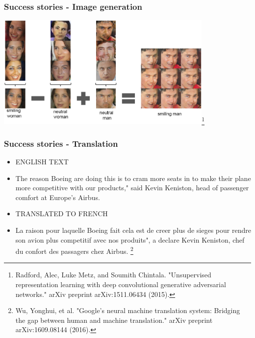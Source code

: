 \documentclass[\beamerclass]{beamer}
\begin{document}
\begin{frame}
	\frametitle{Success stories - Image generation}
	\centering \includegraphics[width=0.8\textwidth]{imggen.pdf}\footnote{Radford, Alec, Luke Metz, and Soumith Chintala. "Unsupervised representation learning with deep convolutional generative adversarial networks." arXiv preprint arXiv:1511.06434 (2015).}
\end{frame}

\begin{frame}
	\frametitle{Success stories - Translation}

\begin{itemize}
\item ENGLISH TEXT
\item The reason Boeing are doing this is to cram more seats in to make their plane
more competitive with our products," said Kevin Keniston, head of passenger
comfort at Europe's Airbus.
\item TRANSLATED TO FRENCH
\item La raison pour laquelle Boeing fait cela est de creer plus de sieges pour rendre
son avion plus competitif avec nos produits", a declare Kevin Keniston, chef
du confort des passagers chez Airbus. \footnote{Wu, Yonghui, et al. "Google's neural machine translation system: Bridging the gap between human and machine translation." arXiv preprint arXiv:1609.08144 (2016).}

%
\end{itemize}
\end{frame}
\end{document}
